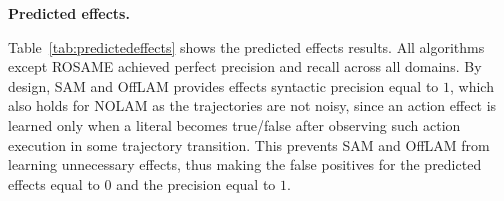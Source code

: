 \documentclass[letterpaper]{article} %
\newcommand{\nolam}{NOLAM\xspace}
\newcommand{\offlam}{OffLAM\xspace}
\newcommand{\rosame}{ROSAME\xspace}
\newcommand{\samshort}{SAM\xspace}
\newcommand{\miniparagraph}[1]{\textbf{#1.}}
\newcommand{\commentout}[1]{ }
\newif\ifaddcomments
\newcommand{\roni}[1]{\ifaddcomments{\textcolor{red}{[Roni: #1]}}\fi}
\newcommand{\leo}[1]{\ifaddcomments{\textcolor{pink}{[Leonardo: #1]}}\fi}
\begin{document}
\miniparagraph{Predicted effects} 
%

%
Table~\ref{tab:predictedeffects} shows the predicted effects results. All algorithms except \rosame achieved perfect precision and recall across all domains. 
By design, \samshort and \offlam provides effects syntactic precision equal to $1$, which also holds for \nolam as the trajectories are not noisy, since an action effect is learned only when a literal becomes true/false after observing such action execution in some trajectory transition. This prevents \samshort and \offlam from learning unnecessary effects, thus making the false positives for the predicted effects equal to $0$ and the precision equal to $1$.
%
%
\end{document}
